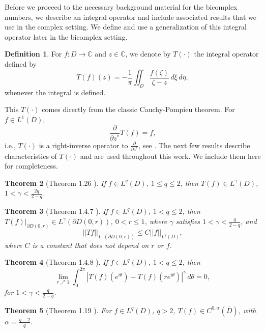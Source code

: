 \documentclass[suppldata]{interact}
\theoremstyle{plain}%
\newtheorem{theorem}{Theorem}[section]
\theoremstyle{definition}
\newtheorem{deff}[theorem]{Definition}
\theoremstyle{remark}
\newcommand{\p}{\partial}
\begin{document}
Before we proceed to the necessary background material for the bicomplex numbers, we describe an integral operator and include associated results that we use in the complex setting. We define and use a generalization of this integral operator later in the bicomplex setting.

\begin{deff}\label{vekopondisk}
For $f: D \to \mathbb{C}$ and $z  \in \mathbb{C}$, we denote by $T(\cdot)$ the integral operator defined by 
\[
T(f)(z) = -\frac{1}{\pi} \iint_D \frac{f(\zeta)}{\zeta - z}\, d\xi\,d\eta,
\]
whenever the integral is defined.
\end{deff}

This $T(\cdot)$ comes directly from the classic Cauchy-Pompieu theorem. For $f \in L^1(D)$, 
\[
    \frac{\p}{\p z^*} T(f) = f,
\]
i.e., $T(\cdot)$ is a right-inverse operator to $\frac{\p}{\p z^*}$, see \cite{Vek, BegBook}. The next few results describe characteristics of $T(\cdot)$ and are used throughout this work. We include them here for completeness.

\begin{theorem}[Theorem 1.26 \cite{Vek} ] \label{Vekonepointtwentysix}
If $f \in L^q(D)$, $1 \leq q \leq 2$, then $T(f) \in L^\gamma(D)$, $1 < \gamma < \frac{2q}{2-q}$. 
\end{theorem}

\begin{theorem}[Theorem 1.4.7 \cite{KlimBook} ]\label{onefourseven}
If $f \in L^q(D)$, $1 < q \leq 2$, then $T(f)|_{\p D(0,r)} \in L^\gamma(\p D(0,r))$, $0 < r \leq 1$, where $\gamma$ satisfies $1 < \gamma < \frac{q}{2-q}$, and 
\[
||Tf||_{L^\gamma(\p D(0,r))} \leq C ||f||_{L^q(D)},
\]
where $C$ is a constant that does not depend on $r$ or $f$. 
\end{theorem}

\begin{theorem}[Theorem 1.4.8 \cite{KlimBook} ]\label{onefoureight}
If $f \in L^q(D)$, $1 < q \leq 2$, then 
\[
\lim_{r\nearrow 1} \int_0^{2\pi} |T(f)(e^{i\theta}) - T(f)(re^{i\theta})|^\gamma \,d\theta = 0, 
\]
for $1 < \gamma < \frac{q}{2-q}$. 
\end{theorem}

\begin{theorem}[Theorem 1.19 \cite{Vek} ]\label{onepointnineteen}
For $f \in L^q(D)$, $q > 2$, $T(f) \in C^{0,\alpha}(\overline{D})$, with $\alpha = \frac{ q-2}{q}$. 
\end{theorem}
\end{document}
